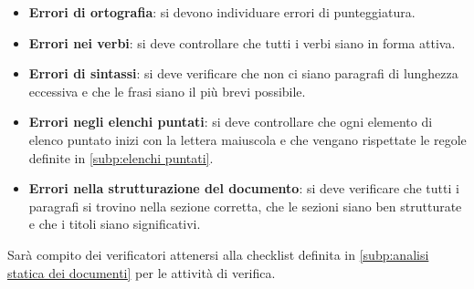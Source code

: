 \documentclass[../norme-di-progetto.tex]{subfiles}
\begin{document}
\begin{itemize}
		\item \textbf{Errori di ortografia}: si devono individuare errori di punteggiatura.
		\item \textbf{Errori nei verbi}: si deve controllare che tutti i verbi siano in forma attiva.
		\item \textbf{Errori di sintassi}: si deve verificare che non ci siano paragrafi di lunghezza eccessiva e che le frasi siano il più brevi possibile.
		\item \textbf{Errori negli elenchi puntati}: si deve controllare che ogni elemento di elenco puntato inizi con la lettera maiuscola e che vengano rispettate le regole definite in \ref{subp:elenchi puntati}.
		\item \textbf{Errori nella strutturazione del documento}: si deve verificare che tutti i paragrafi si trovino nella sezione corretta, che le sezioni siano ben strutturate e che i titoli siano significativi.
\end{itemize}
Sarà compito dei verificatori attenersi alla checklist definita in \ref{subp:analisi statica dei documenti} per le attività di verifica.
\end{document}
